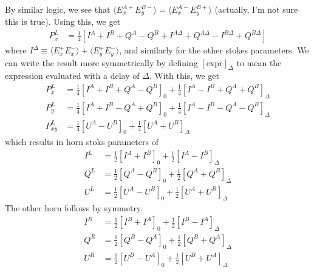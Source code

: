 \documentclass{article}
\begin{document}
By similar logic, we see that $\langle E^{A+}_xE^{B-}_y\rangle = \langle E^{A-}_xE^{B+}_y\rangle$ (actually, I'm not sure this is true). Using this, we get
\begin{align}
	P^L_x &= \frac14 [I^A+I^B+Q^A-Q^B + I^{A\Delta}+Q^{A\Delta}-I^{B\Delta}+Q^{B\Delta}]
\end{align}
where $I^\Delta \equiv \langle E^+_xE^-_x\rangle +\langle E^+_yE^-_y\rangle$, and similarly for the
other stokes parameters. We can write the result more symmetrically by
defining $[\textrm{expr}]_\Delta$ to mean the expression evaluated with
a delay of $\Delta$. With this, we get
\begin{align}
	P^L_x &= \frac14 [I^A+I^B+Q^A-Q^B]_0 + \frac14[I^A-I^B+Q^A+Q^B]_\Delta \\
	P^L_y &= \frac14 [I^A+I^B-Q^A+Q^B]_0 + \frac14[I^A-I^B-Q^A-Q^B]_\Delta \\
	P^L_{xy} &= \frac14 [U^A-U^B]_0 + \frac14[U^A+U^B]_\Delta
\end{align}
which results in horn stoks parameters of
\begin{align}
	I^L &= \frac12 [I^A+I^B]_0 + \frac12[I^A-I^B]_\Delta \\
	Q^L &= \frac12 [Q^A-Q^B]_0 + \frac12[Q^A+Q^B]_\Delta \\
	U^L &= \frac12 [U^A-U^B]_0 + \frac12[U^A+U^B]_\Delta
\end{align}
The other horn follows by symmetry.
\begin{align}
	I^R &= \frac12 [I^B+I^A]_0 + \frac12[I^B-I^A]_\Delta \\
	Q^R &= \frac12 [Q^B-Q^A]_0 + \frac12[Q^B+Q^A]_\Delta \\
	U^R &= \frac12 [U^B-U^A]_0 + \frac12[U^B+U^A]_\Delta
\end{align}
\end{document}
